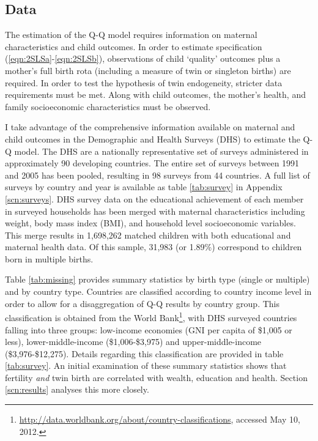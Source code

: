 \documentclass{article}[11pt,subeqn]
\begin{document}
\begin{spacing}{1.5}
\section{Data}
\label{scn:data}
\vspace{-5mm}
The estimation of the Q-Q model requires information on maternal characteristics and child outcomes. In order to estimate 
specification (\ref{eqn:2SLSa}-\ref{eqn:2SLSb}), observations of child `quality' outcomes plus a mother's full birth rota (including a 
measure of twin or singleton births) are required.  In order to test the hypothesis of twin endogeneity, stricter data requirements 
must be met.  Along with child outcomes, the mother's health, and family socioeconomic characteristics must be observed.

I take advantage of the comprehensive information available on maternal and child outcomes in the Demographic and Health Surveys (DHS) 
to estimate the Q-Q model.  The DHS are a nationally representative set of surveys administered in approximately 90 developing countries.  
The entire set of surveys between 1991 and 2005 has been pooled, resulting in 98 surveys from 44 countries.  A full list of surveys by 
country and year is available as table \ref{tab:survey} in Appendix \ref{scn:surveys}.  DHS survey data on the educational achievement 
of each member in surveyed households has been merged with maternal characteristics including weight, body mass index (BMI), and 
household level socioeconomic variables.  This merge results in 1,698,262 matched children with both educational and maternal health
data.  Of this sample, 31,983 (or 1.89\%) correspond to children born in multiple births.

Table \ref{tab:missing} provides summary statistics by birth type (single or multiple) and by country type.  Countries are classified 
according to country income level in order to allow for a disaggregation of Q-Q results by country group.  This classification is obtained
from the World Bank\footnote{\url{http://data.worldbank.org/about/country-classifications},  accessed May 10, 2012.}, with DHS
surveyed countries falling into three groups: low-income economies (GNI per capita of \$1,005 or less), lower-middle-income (\$1,006-\$3,975)
and upper-middle-income (\$3,976-\$12,275).  Details regarding this classification are provided in table \ref{tab:survey}.  An initial 
examination of these summary statistics shows that fertility \emph{and} twin birth are correlated with wealth, education and health.
Section \ref{scn:results} analyses this more closely.


\end{spacing}
\end{document}
